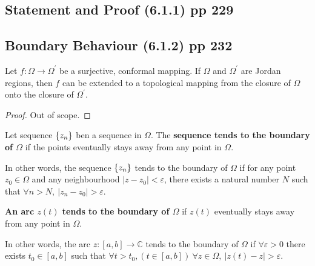 \subsection{Statement and Proof (6.1.1) pp 229}
\subsection{Boundary Behaviour (6.1.2) pp 232}
\begin{commentary}
\begin{theorem}
	Let $f : \Omega \to \Omega^\prime$ be a surjective, conformal mapping.
	If $\Omega$ and $\Omega^\prime$ are Jordan regions, then $f$ can be extended to a topological mapping from the closure of $\Omega$ onto the closure of $\Omega^\prime$.
\end{theorem}
\begin{proof}
	Out of scope.
\end{proof}
\end{commentary}

\begin{definition}
	Let sequence $\left\{z_n\right\}$ ben a sequence in $\Omega$. The \textbf{sequence tends to the boundary of $\Omega$} if the points eventually stays away from any point in $\Omega$.
\end{definition}

In other words, the sequence $\left\{z_n\right\}$ tends to the boundary of $\Omega$ if for any point $z_0 \in \Omega$ and any neighbourhood $|z - z_0| < \varepsilon$, there exists a natural number $N$ such that $\forall n > N,\ |z_n - z_0|>\varepsilon$.

\begin{definition}
	\textbf{An arc $z(t)$ tends to the boundary of $\Omega$} if $z(t)$ eventually stays away from any point in $\Omega$.
\end{definition}
In other words, the arc $z : [a,b] \to \mathbb{C}$ tends to the boundary of $\Omega$ if $\forall \varepsilon > 0$ there exists $t_0 \in [a,b]$ such that $\forall t > t_0,(t \in [a,b])\ \forall z \in \Omega,\ |z(t)-z| > \varepsilon$.

